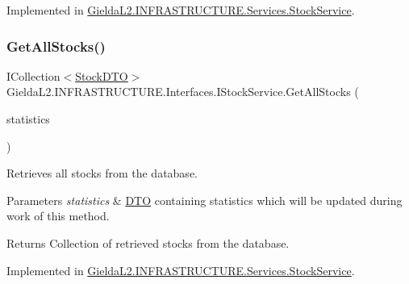 Implemented in \mbox{\hyperlink{class_gielda_l2_1_1_i_n_f_r_a_s_t_r_u_c_t_u_r_e_1_1_services_1_1_stock_service_a5f14ef809d7aa93ee952adb311bc1d32}{Gielda\+L2.\+I\+N\+F\+R\+A\+S\+T\+R\+U\+C\+T\+U\+R\+E.\+Services.\+Stock\+Service}}.

\mbox{\label{interface_gielda_l2_1_1_i_n_f_r_a_s_t_r_u_c_t_u_r_e_1_1_interfaces_1_1_i_stock_service_ae94c4404091898a36f0d5eafa5b0b7d9}} 
\subsubsection{\texorpdfstring{GetAllStocks()}{GetAllStocks()}}
{\footnotesize\ttfamily I\+Collection$<$\mbox{\hyperlink{class_gielda_l2_1_1_i_n_f_r_a_s_t_r_u_c_t_u_r_e_1_1_d_t_o_1_1_stock_d_t_o}{Stock\+D\+TO}}$>$ Gielda\+L2.\+I\+N\+F\+R\+A\+S\+T\+R\+U\+C\+T\+U\+R\+E.\+Interfaces.\+I\+Stock\+Service.\+Get\+All\+Stocks (\begin{DoxyParamCaption}\item[{\mbox{\hyperlink{class_gielda_l2_1_1_i_n_f_r_a_s_t_r_u_c_t_u_r_e_1_1_d_t_o_1_1_statistics_d_t_o}{Statistics\+D\+TO}}}]{statistics }\end{DoxyParamCaption})}



Retrieves all stocks from the database. 


\begin{DoxyParams}{Parameters}
{\em statistics} & \mbox{\hyperlink{namespace_gielda_l2_1_1_i_n_f_r_a_s_t_r_u_c_t_u_r_e_1_1_d_t_o}{D\+TO}} containing statistics which will be updated during work of this method.\\
\hline
\end{DoxyParams}
\begin{DoxyReturn}{Returns}
Collection of retrieved stocks from the database.
\end{DoxyReturn}


Implemented in \mbox{\hyperlink{class_gielda_l2_1_1_i_n_f_r_a_s_t_r_u_c_t_u_r_e_1_1_services_1_1_stock_service_a1923e787cf70d1442d2108c064087202}{Gielda\+L2.\+I\+N\+F\+R\+A\+S\+T\+R\+U\+C\+T\+U\+R\+E.\+Services.\+Stock\+Service}}.

